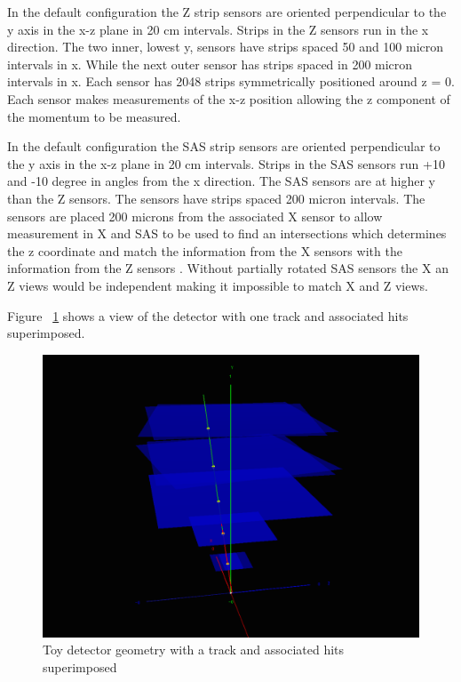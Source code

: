 \documentclass[aps,prd,superscriptaddress,floatfix]{revtex4}
\begin{document}
In the default configuration the Z strip sensors are oriented perpendicular to the y axis in
the x-z plane in 20 cm intervals.  Strips in the Z sensors run in the x
direction.  The two inner, lowest y,  sensors have strips spaced 50
and 100 micron intervals in x. While the next outer sensor has strips spaced in 200 micron
intervals in x.  Each sensor has 2048 strips symmetrically positioned
around z = 0.  Each sensor makes measurements of the x-z position allowing
the z component of the momentum to be measured.

In the default configuration the SAS strip sensors are oriented perpendicular to the y axis in
the x-z plane in 20 cm intervals.  Strips in the SAS sensors run
+10 and -10 degree in angles from the x
direction.  The SAS sensors are at higher y than the Z sensors.  The  sensors have strips spaced 200 micron
intervals.  The sensors are placed 200 microns from the associated X sensor to allow measurement in X
and SAS to be used to find an intersections which determines the z coordinate and match the information from the X sensors with the 
information from the Z sensors .  Without partially rotated SAS sensors the X an Z views would be independent making it impossible to match X and Z
views.

Figure ~\ref{fig:detector} shows a view of the detector with one track and associated hits superimposed.

\begin{figure}[hbtp]
  \begin{center}
    \includegraphics[width=17.0cm]{detector.png}
   \caption{Toy detector geometry with a track and associated hits superimposed}
    \label{fig:detector}
  \end{center}
\end{figure}
\end{document}
